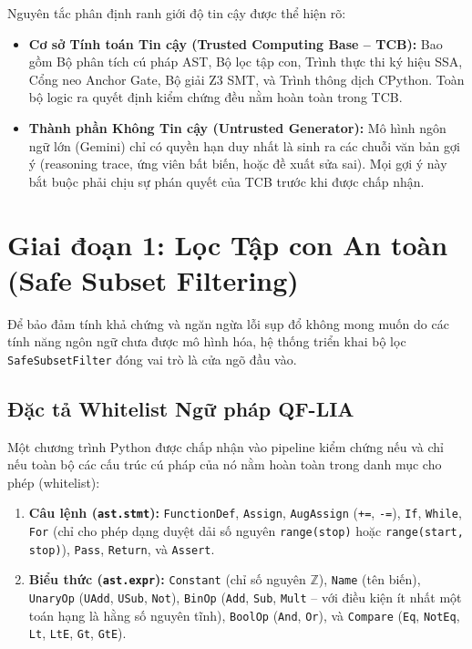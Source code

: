 Nguyên tắc phân định ranh giới độ tin cậy được thể hiện rõ:
\begin{itemize}
    \item \textbf{Cơ sở Tính toán Tin cậy (Trusted Computing Base -- TCB):} Bao gồm Bộ phân tích cú pháp AST, Bộ lọc tập con, Trình thực thi ký hiệu SSA, Cổng neo Anchor Gate, Bộ giải Z3 SMT, và Trình thông dịch CPython. Toàn bộ logic ra quyết định kiểm chứng đều nằm hoàn toàn trong TCB.
    \item \textbf{Thành phần Không Tin cậy (Untrusted Generator):} Mô hình ngôn ngữ lớn (Gemini) chỉ có quyền hạn duy nhất là sinh ra các chuỗi văn bản gợi ý (reasoning trace, ứng viên bất biến, hoặc đề xuất sửa sai). Mọi gợi ý này bắt buộc phải chịu sự phán quyết của TCB trước khi được chấp nhận.
\end{itemize}

\section{Giai đoạn 1: Lọc Tập con An toàn (Safe Subset Filtering)}
\label{sec:safe_subset}

Để bảo đảm tính khả chứng và ngăn ngừa lỗi sụp đổ không mong muốn do các tính năng ngôn ngữ chưa được mô hình hóa, hệ thống triển khai bộ lọc \texttt{SafeSubsetFilter} đóng vai trò là cửa ngõ đầu vào.

\subsection{Đặc tả Whitelist Ngữ pháp QF-LIA}
Một chương trình Python được chấp nhận vào pipeline kiểm chứng nếu và chỉ nếu toàn bộ các cấu trúc cú pháp của nó nằm hoàn toàn trong danh mục cho phép (whitelist):
\begin{enumerate}
    \item \textbf{Câu lệnh (\texttt{ast.stmt}):} \texttt{FunctionDef}, \texttt{Assign}, \texttt{AugAssign} (\texttt{+=}, \texttt{-=}), \texttt{If}, \texttt{While}, \texttt{For} (chỉ cho phép dạng duyệt dải số nguyên \texttt{range(stop)} hoặc \texttt{range(start, stop)}), \texttt{Pass}, \texttt{Return}, và \texttt{Assert}.
    \item \textbf{Biểu thức (\texttt{ast.expr}):} \texttt{Constant} (chỉ số nguyên $\mathbb{Z}$), \texttt{Name} (tên biến), \texttt{UnaryOp} (\texttt{UAdd}, \texttt{USub}, \texttt{Not}), \texttt{BinOp} (\texttt{Add}, \texttt{Sub}, \texttt{Mult} -- với điều kiện ít nhất một toán hạng là hằng số nguyên tĩnh), \texttt{BoolOp} (\texttt{And}, \texttt{Or}), và \texttt{Compare} (\texttt{Eq}, \texttt{NotEq}, \texttt{Lt}, \texttt{LtE}, \texttt{Gt}, \texttt{GtE}).
\end{enumerate}

